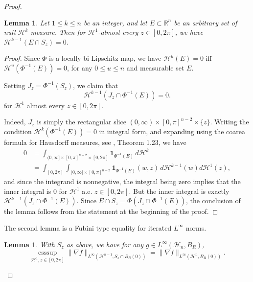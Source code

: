 \documentclass{article}
\newtheorem{lemma}[theorem]{Lemma}
\DeclareMathOperator{\esssup}{esssup}
\begin{document}
\begin{proof}
\begin{lemma}\label{slicing}Let $1 \leq k \leq n$ be an integer, and let $E \subset \mathbb R^n$ be an arbitrary set of null $\mathcal H^k$ measure. Then for $\mathcal H^1$-almost every  $z \in [0, 2\pi]$, we have $\mathcal H^{k-1} (E \cap S_{z}) = 0$.\end{lemma} 

\begin{proof} Since $\Phi$ is a locally bi-Lipschitz map, we have $\mathcal H^u(E) = 0$ iff $\mathcal H^u (\Phi^{-1}(E)) = 0$, for any $0 \leq u \leq n$ and measurable set $E$. 

\noindent Setting $J_{z} = \Phi^{-1} (S_{z})$, we claim that
$$\mathcal H^{k-1} (J_z \cap \Phi^{-1} (E)) = 0.$$
for $\mathcal H^{1}$ almost every $z \in [0, 2\pi]$.

\noindent Indeed, $J_z$ is simply the rectangular slice $(0, \infty) \times [0, \pi]^{n-2} \times \{z\}$. Writing the condition $\mathcal H^k(\Phi^{-1} (E)) = 0$ in integral form, and expanding using the coarea formula for Hausdorff measures, see \cite{coarea}, Theorem 1.23, we have
$$\begin{aligned} 0 &= \int_{(0, \infty] \times [0, \pi]^{n-2} \times [0, 2\pi]} \mathbf 1_{\Phi^{-1}(E)} \, d \mathcal H^k \\
&= \int_{[0, 2\pi]} \int_{(0, \infty] \times [0, \pi]^{n-2}} \mathbf 1_{\Phi^{-1}(E)}(w,z) \, d\mathcal H^{k-1}(w) d\mathcal H^1 (z), \end{aligned}$$
\noindent and since the integrand is nonnegative, the integral being zero implies that the inner integral is $0$ for $\mathcal H^1$ a.e. $z \in [0, 2\pi]$. But the inner integral is exactly $\mathcal H^{k-1} (J_z \cap \Phi^{-1}(E))$. Since $E \cap S_z = \Phi(J_z \cap \Phi^{-1} (E))$, the conclusion of the lemma follows from the statement at the beginning of the proof.\end{proof}

\noindent The second lemma is a Fubini type equality for iterated $L^\infty$ norms.

\begin{lemma}\label{iterated}
\noindent With $S_z$ as above, we have for any $g \in L^\infty (\mathcal H_n, B_R)$,
$$\underset{ \mathcal H^1, z \in [0, 2\pi]}{\esssup} \|\nabla f\|_{L^\infty (\mathcal H^{n-1}, S_z \cap B_R(0))} = \|\nabla f\|_{L^\infty (\mathcal H^n, B_R(0))}.$$
\end{lemma}


\end{proof}
\end{document}
